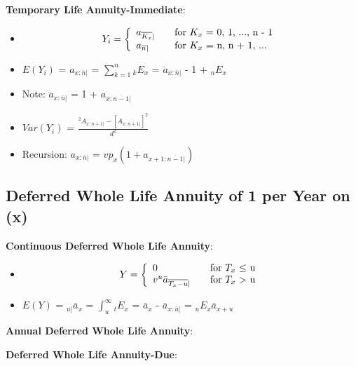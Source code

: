 \documentclass[]{book}
\begin{document}
\textbf{Temporary Life Annuity-Immediate}:

\begin{itemize}
\item
  \[Y_i = \left\{
    \begin{array}{l l}
      a_{\overline{K_x}|}   & \quad \text{for $K_x$ = 0, 1, ..., n - 1}\\
      a_{\overline{n}|}             & \quad \text{for $K_x$ = n, n + 1, ...}\\
    \end{array} \right.\]
\item
  \(E(Y_i)\) = \(a_{x :\overline{n}|}\) = \(\sum^{n}_{k = 1} {}_{k}E_x\)
  = \(\ddot{a}_{x:\overline{n}|}\) - 1 + \({}_{n}E_x\)
\item
  Note: \(\ddot{a}_{x:\overline{n}|}\) = 1 +
  \(a_{x :\overline{n - 1}|}\)
\item
  \(Var(Y_i)\) =
  \(\frac{^2 A_{x:\overline{n+1}|} - [A_{x:\overline{n+1}|}]^2}{d^2}\)
\item
  Recursion: \(a_{x :\overline{n}|}\) =
  \(vp_x(1 + a_{x + 1 :\overline{n - 1}|})\)
\end{itemize}

\subsection{Deferred Whole Life Annuity of 1 per Year on
(x)}\label{deferred-whole-life-annuity-of-1-per-year-on-x}

\textbf{Continuous Deferred Whole Life Annuity}:

\begin{itemize}
\item
  \[Y = \left\{
    \begin{array}{l l}
      0               & \quad \text{for $T_x$ $\le$ u}\\
      v^u \bar{a}_{\overline{T_x - u}|}         & \quad \text{for $T_x$ $>$ u}\\
    \end{array} \right.\]
\item
  \(E(Y)\) = \({}_{u|}\bar{a}_x\) = \(\int^{\infty}_u {}_{t}E_x\) =
  \(\bar{a}_x\) - \(\bar{a}_{x:\overline{u}|}\) =
  \({}_{u}E_x\)\(\bar{a}_{x + u}\)
\end{itemize}

\textbf{Annual Deferred Whole Life Annuity}:

\textbf{Deferred Whole Life Annuity-Due}:
\end{document}
